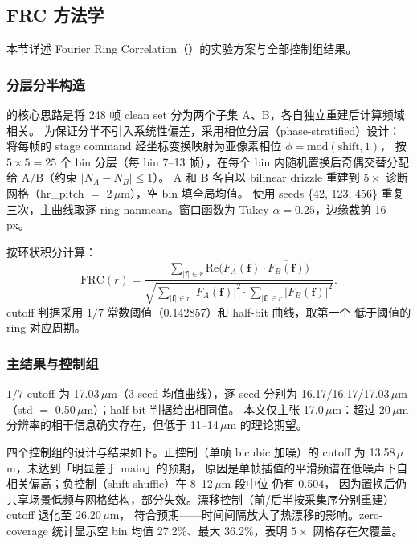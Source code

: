 \subsection{FRC 方法学}

本节详述 Fourier Ring Correlation（）的实验方案与全部控制组结果。

\subsubsection{分层分半构造}

 的核心思路是将 248 帧 clean set 分为两个子集 A、B，各自独立重建后计算频域相关。
为保证分半不引入系统性偏差，采用相位分层（phase-stratified）设计：将每帧的 stage command 经坐标变换映射为亚像素相位 \(\phi = \mathrm{mod}(\text{shift}, 1)\)，
按 \(5 \times 5 = 25\) 个 bin 分层（每 bin 7--13 帧），在每个 bin 内随机置换后奇偶交替分配给 A/B（约束 \(|N_A - N_B| \le 1\)）。
A 和 B 各自以 bilinear drizzle 重建到 \(5\times\) 诊断网格（hr\_pitch \(=\) 2\,\(\mu\)m），空 bin 填全局均值。
使用 seeds \{42, 123, 456\} 重复三次，主曲线取逐 ring nanmean。窗口函数为 Tukey \(\alpha = 0.25\)，边缘裁剪 16  px。

 按环状积分计算：
\[
  \mathrm{FRC}(r) = \frac{\sum_{|\mathbf{f}| \in r} \mathrm{Re}\bigl(F_A(\mathbf{f}) \cdot \overline{F_B(\mathbf{f})}\bigr)}{\sqrt{\sum_{|\mathbf{f}| \in r} |F_A(\mathbf{f})|^2 \cdot \sum_{|\mathbf{f}| \in r} |F_B(\mathbf{f})|^2}}.
\]
cutoff 判据采用 \(1/7\) 常数阈值（0.142857）和 half-bit 曲线，取第一个  低于阈值的 ring 对应周期。

\subsubsection{主结果与控制组}

\(1/7\) cutoff 为 17.03\,\(\mu\)m（3-seed 均值曲线），逐 seed 分别为 16.17/16.17/17.03\,\(\mu\)m（std \(=\) 0.50\,\(\mu\)m）；half-bit 判据给出相同值。
本文仅主张 17.0\,\(\mu\)m：超过 20\,\(\mu\)m 分辨率的相干信息确实存在，但低于 11--14\,\(\mu\)m 的理论期望。

四个控制组的设计与结果如下。正控制（单帧 bicubic 加噪）的 cutoff 为 13.58\,\(\mu\)m，未达到「明显差于 main」的预期，
原因是单帧插值的平滑频谱在低噪声下自相关偏高；负控制（shift-shuffle）在 8--12\,\(\mu\)m 段中位  仍有 0.504，
因为置换后仍共享场景低频与网格结构，部分失效。漂移控制（前/后半按采集序分别重建）cutoff 退化至 26.20\,\(\mu\)m，
符合预期——时间间隔放大了热漂移的影响。zero-coverage 统计显示空 bin 均值 27.2\%、最大 36.2\%，表明 \(5\times\) 网格存在欠覆盖。

